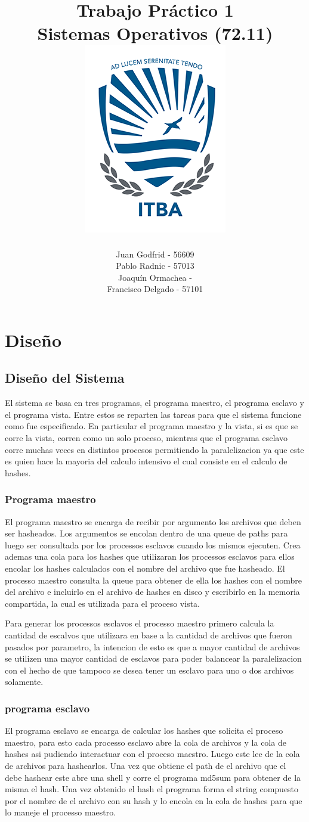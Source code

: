 \documentclass[10pt,a4paper]{report}
\title{
	\bf\color{darkcerulean} Trabajo Práctico 1 \\
	\color{black}Sistemas Operativos (72.11) \\
	\includegraphics{itba-escudo2}
	}
\author{Juan Godfrid - 56609 \\Pablo Radnic - 57013 \\ Joaquín Ormachea - \\Francisco Delgado - 57101}
\begin{document}
\maketitle

\newpage
\tableofcontents
\newpage


\chapter{Diseño}

\section{Diseño del Sistema}
El sistema se basa en tres programas, el programa maestro, el programa esclavo y el programa vista. Entre estos se reparten las tareas para que el sistema funcione como fue especificado. En particular el programa maestro y la vista, si es que se corre la vista, corren como un solo proceso, mientras que el programa esclavo corre muchas veces en distintos procesos permitiendo la paralelizacion ya que este es quien hace la mayoria del calculo intensivo el cual consiste en el calculo de hashes.

\subsection{Programa maestro}
	El programa maestro se encarga de recibir por argumento los archivos que deben ser hasheados. Los argumentos se encolan dentro de una queue de paths para luego ser consultada por los processos esclavos cuando los mismos ejecuten. Crea ademas una cola para los hashes que utilizaran los processos esclavos para ellos encolar los hashes calculados con el nombre del archivo que fue hasheado. El processo maestro consulta la queue para obtener de ella los hashes con el nombre del archivo e incluirlo en el archivo de hashes en disco y escribirlo en la memoria compartida, la cual es utilizada para el proceso vista.

	Para generar los processos esclavos el processo maestro primero calcula la cantidad de escalvos que utilizara en base a la cantidad de archivos que fueron pasados por parametro, la intencion de esto es que a mayor cantidad de archivos se utilizen una mayor cantidad de esclavos para poder balancear la paralelizacion con el hecho de que tampoco se desea tener un esclavo para uno o dos archivos solamente.
\subsection{programa esclavo}
	El programa esclavo se encarga de calcular los hashes que solicita el proceso maestro, para esto cada processo esclavo abre la cola de archivos y la cola de hashes asi pudiendo interactuar con el proceso maestro. Luego este lee de la cola de archivos para hashearlos. Una vez que obtiene el path de el archivo que el debe hashear este abre una shell y corre el programa md5sum para obtener de la misma el hash.
	Una vez obtenido el hash el programa forma el string compuesto por el nombre de el archivo con su hash y lo encola en la cola de hashes para que lo maneje el processo maestro.
\end{document}

